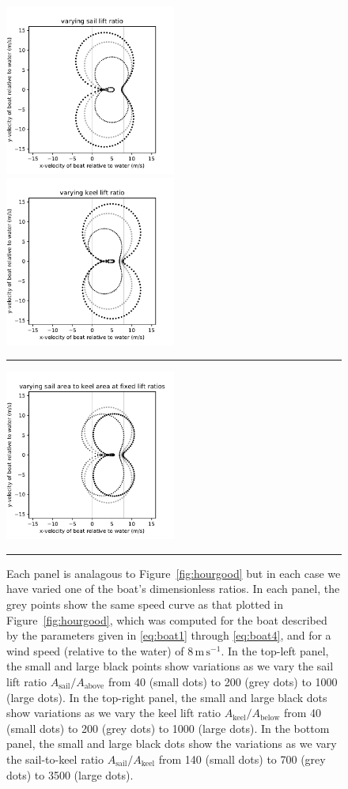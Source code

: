 \documentclass[letterpaper]{article}
\newcommand{\sail}{\text{sail}}
\newcommand{\keel}{\text{keel}}
\renewcommand{\above}{\text{above}}
\newcommand{\below}{\text{below}}
\newcommand{\mps}{\mathrm{m\,s^{-1}}}
\newcommand{\figref}[1]{Figure~\ref{#1}}
\newcommand{\figurerule}{\rule[1ex]{\textwidth}{0.2pt}}
\begin{document}
\begin{figure}[t!]
  \includegraphics[width=0.5\textwidth]{design_A.pdf}%
  \includegraphics[width=0.5\textwidth]{design_C.pdf}\\%
  \rule{0.25\textwidth}{0pt}\includegraphics[width=0.5\textwidth]{design_E.pdf}
  \caption{Each panel is analagous to \figref{fig:hourgood} but in each case we have varied one of the boat's dimensionless ratios. In each panel, the grey points show the same speed curve as that plotted in \figref{fig:hourgood}, which was computed for the boat described by the parameters given in \eqref{eq:boat1} through \eqref{eq:boat4}, and for a wind speed (relative to the water) of $8\,\mps$.
  In the top-left panel, the small and large black points show variations as we vary the sail lift ratio $A_\sail/A_\above$ from 40 (small dots) to 200 (grey dots) to 1000 (large dots).
  In the top-right panel, the small and large black dots show variations as we vary the keel lift ratio $A_\keel/A_\below$ from 40 (small dots) to 200 (grey dots) to 1000 (large dots).
  In the bottom panel, the small and large black dots show the variations as we vary the sail-to-keel ratio $A_\sail/A_\keel$ from 140 (small dots) to 700 (grey dots) to 3500 (large dots).\label{fig:design}}
  \figurerule
\end{figure}
\end{document}
